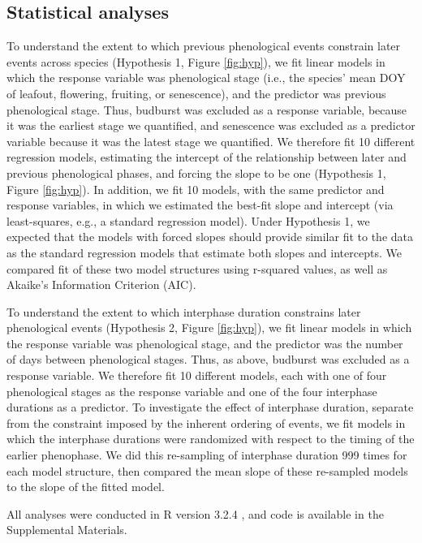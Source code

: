 \documentclass{article}
\begin{document}
\subsection*{Statistical analyses}
To understand the extent to which previous phenological events constrain later events across species (Hypothesis 1, Figure \ref{fig:hyp}), we fit linear models in which the response variable was phenological stage (i.e., the species' mean DOY of leafout, flowering, fruiting, or senescence), and the predictor was previous phenological stage. Thus, budburst was excluded as a response variable, because it was the earliest stage we quantified, and senescence was excluded as a predictor variable because it was the latest stage we quantified.  We therefore fit 10 different regression models, estimating the intercept of the relationship between later and previous phenological phases, and forcing the slope to be one (Hypothesis 1, Figure \ref{fig:hyp}). In addition, we fit 10 models, with the same predictor and response variables, in which we estimated the best-fit slope and intercept (via least-squares, e.g., a standard regression model). Under Hypothesis 1, we expected that the models with forced slopes should provide similar fit to the data as the standard regression models that estimate both slopes and intercepts. We compared fit of these two model structures using r-squared values, as well as Akaike's Information Criterion (AIC).  
\par To understand the extent to which interphase duration constrains later phenological events (Hypothesis 2, Figure \ref{fig:hyp}), we fit linear models in which the response variable was phenological stage, and the predictor was the number of days between phenological stages. Thus, as above, budburst was excluded as a response variable. We therefore fit 10 different models, each with one of four phenological stages as the response variable and one of the four interphase durations as a predictor. To investigate the effect of interphase duration, separate from the constraint imposed by the inherent ordering of events, we fit models in which the interphase durations were randomized with respect to the timing of the earlier phenophase. We did this re-sampling of interphase duration 999 times for each model structure, then compared the mean slope of these re-sampled models to the slope of the fitted model.  
\par All analyses were conducted in R version 3.2.4 \citep{rcoreteam2016}, and code is available in the Supplemental Materials.
\end{document}
